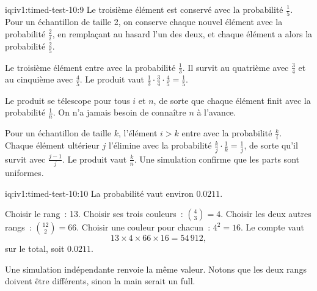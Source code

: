 \begin{solution}{iq:iv1:timed-test-10:9}
Le troisième élément est conservé avec la probabilité $\frac15$. Pour un échantillon de taille 2, on conserve chaque nouvel élément avec la probabilité $\frac2i$, en remplaçant au hasard l'un des deux, et chaque élément a alors la probabilité $\frac25$.

Le troisième élément entre avec la probabilité $\frac13$. Il survit au quatrième avec $\frac34$ et au cinquième avec $\frac45$. Le produit vaut $\frac13 \cdot \frac34 \cdot \frac45 = \frac15$.

Le produit se télescope pour tous $i$ et $n$, de sorte que chaque élément finit avec la probabilité $\frac1n$. On n'a jamais besoin de connaître $n$ à l'avance.

Pour un échantillon de taille $k$, l'élément $i > k$ entre avec la probabilité $\frac{k}{i}$. Chaque élément ultérieur $j$ l'élimine avec la probabilité $\frac{k}{j} \cdot \frac1k = \frac1j$, de sorte qu'il survit avec $\frac{j - 1}{j}$. Le produit vaut $\frac{k}{n}$. Une simulation confirme que les parts sont uniformes.

\end{solution}

\enlargethispage{-6\baselineskip}%
\begin{solution}{iq:iv1:timed-test-10:10}
La probabilité vaut environ $0.0211$.

Choisir le rang~: 13. Choisir ses trois couleurs~: $\binom43 = 4$. Choisir les deux autres rangs~: $\binom{12}{2} = 66$. Choisir une couleur pour chacun~: $4^2 = 16$. Le compte vaut
\[
13 \times 4 \times 66 \times 16 = 54\,912,
\]
sur le total, soit $0.0211$.

Une simulation indépendante renvoie la même valeur. Notons que les deux rangs doivent être différents, sinon la main serait un full.


\end{solution}

